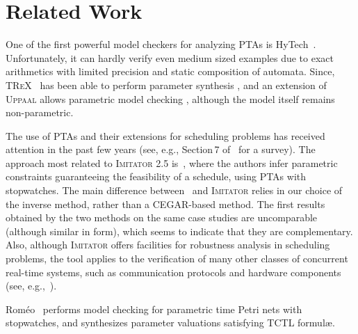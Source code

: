 \documentclass{llncs}
\newcommand{\hytech}{{\sc HyTech}}
\newcommand{\imitator}{\textsc{Imitator}}
\newcommand{\romeo}{Rom\'eo}
\newcommand{\trex}{\textsc{TReX}}
\newcommand{\uppaal}{\textsc{Uppaal}}
\newcommand{\commentaire}[1]{\textcolor{red}{\textbf{$\Leftarrow$  #1 $\Rightarrow$}}}
\begin{document}
\section{Related Work}

One of the first powerful model checkers for analyzing PTAs is \hytech{}~\cite{hhw97}.
Unfortunately, it can hardly verify even medium sized examples due to exact arithmetics with limited precision and static composition of automata.
Since, \trex{}~\cite{abs01} has been able to perform parameter synthesis%
, and an extension of \uppaal{} allows parametric model checking \cite{BLR05formats}, although the model itself remains non-parametric.


The use of PTAs and their extensions for scheduling problems has received attention in the past few years (see, e.g., Section\,7 of~\cite{cpr08} for a survey).
The approach most related to \imitator{} 2.5 is~\cite{cpr08,LPPRC10}, where the authors infer parametric constraints guaranteeing the feasibility of a schedule, using PTAs with stopwatches.
The main difference between~\cite{cpr08,LPPRC10} and \imitator{} relies in our choice of the inverse method, rather than a CEGAR-based method.
The first results obtained by the two methods on the same case studies
are uncomparable (although similar in form), which seems to indicate
that they are complementary.
Also, although \imitator{} offers facilities for robustness analysis in scheduling problems, the tool applies to the verification of many other classes of concurrent real-time systems, such as communication protocols and hardware components (see, e.g.,~\cite{acef09}).

\romeo{}~\cite{lrst09} performs 
model checking for parametric time Petri nets with stopwatches, and synthesizes parameter valuations satisfying TCTL formul\ae{}.

\end{document}

